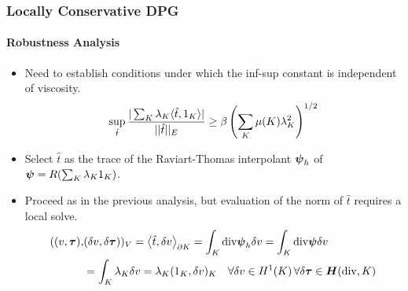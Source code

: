 \documentclass[18pt,xcolor=table]{beamer}
\begin{document}
\begin{frame}[noframenumbering]
\frametitle{Locally Conservative DPG}
\framesubtitle{Robustness Analysis}
\begin{itemize}
    \item Need to establish conditions under which the inf-sup constant is
      independent of viscosity.
      \begin{equation*}
        \sup_{\hat{t}} \frac{| \sum_K \lambda_K \langle \hat{t},1_K \rangle |}{|| \hat{t} ||_E}
        \geq  \beta \left( \sum_K \mu(K) \lambda_K^2 \right)^{1/2}
      \end{equation*}
    \item Select $\hat t$ as the trace of the Raviart-Thomas interpolant
      $\boldsymbol\psi_h$ of $\boldsymbol\psi=R(\sum_K\lambda_K1_K)$.
    \item Proceed as in the previous analysis, but evaluation of the norm of
      $\hat t$ requires a local solve.
      \begin{align*}
        ( (v,\boldsymbol\tau),&(\delta v,\delta\boldsymbol\tau) )_V
        =\left\langle \hat t,\delta v \right\rangle_{\partial K}
        =\int_K\text{div}\boldsymbol\psi_h\delta v
        =\int_K\text{div}\boldsymbol\psi\delta v\\
        &=\int_K\lambda_K\delta v=\lambda_K(1_K,\delta v)_K
        \quad\forall\delta v\in
        H^1(K)\,\forall\delta\boldsymbol\tau\in\mbox{\boldmath $H$}(\text{div},K)
      \end{align*}
\end{itemize}
\end{frame}

\end{document}
